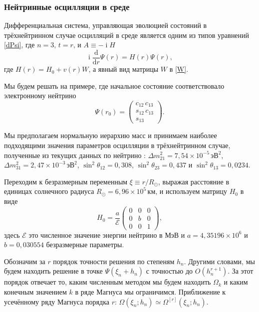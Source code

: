 \documentclass[12pt]{article}
\DeclareMathOperator\Iunit{i}
\renewcommand\imath\Iunit
\begin{document}
\subsubsection{Нейтринные осцилляции в среде}

Дифференциальная система, управляющая эволюцией состояний в трёхнейтринном
случае осцилляций в среде является одним из типов уравнений \eqref{dPsi}, где
$n=3$, $t=r$, и $A\equiv -\imath H$
\begin{equation}
  \imath\frac{\text{d}}{\text{d}r}\Psi(r)=H(r)\Psi(r),
\end{equation}
где $H(r)=H_0 + v(r)W$, а явный вид матрицы $W$ в \eqref{W}.

Мы будем решать на примере, где начальное состояние соответствовало электронному
нейтрино
\begin{equation}
  \Psi(r_0)=
  \begin{pmatrix}
    c_{12}\, c_{13}\\
    s_{12}\, c_{13}\\
    s_{13}
  \end{pmatrix}.
\end{equation}

Мы предполагаем нормальную иерархию масс и принимаем наиболее подходящими
значения параметров осцилляции в трёхнейтринном случае, полученные из текущих
данных по нейтрино \cite{pdg}:
\(\Delta m^2_{21}=7{,}54\times 10^{-5}\,\text{эВ}^2\), \(\Delta m^2_{31}=2{,}47 \times
10^{-3}\,\text{эВ}^2\), \(\sin^2\theta_{12}=0{,}308\), \(\sin^2\theta_{23}=0{,}437\) и
\(\sin^2\theta_{13}=0{,}0234\).

Переходим к безразмерным переменным $\xi\equiv r/R_\odot$, выражая расстояние в
единицах солнечного радиуса \(R_\odot=6{,}96\times10^5\,\text{км}\), и
используем матрицу $H_0$ в виде
\begin{equation}
  H_0=\frac{a}{\mathcal{E}}
  \begin{pmatrix}
    0& 0& 0\\
    0& b& 0\\
    0& 0& 1
  \end{pmatrix},
\end{equation}
здесь $\mathcal{E}$ это численное значение энергии нейтрино в \(\text{МэВ}\) и
$a=4{,}35196\times 10^6$ и $b=0{,}030554$ безразмерные параметры.

Обозначим за $r$ порядок точности решения по степеням $h_n$. Другими словами, мы
будем находить решение в точке $\Psi(\xi_n+h_n)$ с точностью до
$O(h^{r+1}_n)$. За этот порядок отвечает то, каким численным методом мы будем
находить $\Omega_k$ и каким конечным значением $k$ в ряде Магнуса мы
ограничимся. Приближение к усечённому ряду Магнуса порядка $r$:
$\Omega(\xi_n;h_n)\simeq \Omega^{[r]}(\xi_n;h_n)$.
\end{document}
